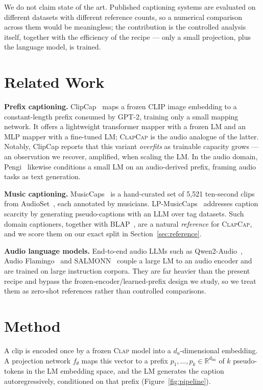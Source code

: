 \documentclass[conference]{IEEEtran}
\newcommand{\clapenc}{\textsc{Clap}}
\newcommand{\sys}{\textsc{ClapCap}}
\begin{document}
We do not claim state of the art. Published captioning systems are evaluated on different
datasets with different reference counts, so a numerical comparison across them would be
meaningless; the contribution is the controlled analysis itself, together with the efficiency of
the recipe --- only a small projection, plus the language model, is trained.

\section{Related Work}\label{ch:related}

\textbf{Prefix captioning.} ClipCap~\cite{mokady2021clipcap} maps a frozen CLIP image embedding
to a constant-length prefix consumed by GPT-2, training only a small mapping network. It offers
a lightweight transformer mapper with a frozen LM and an MLP mapper with a fine-tuned LM;
\sys{} is the audio analogue of the latter. Notably, ClipCap reports that this variant
\emph{overfits} as trainable capacity grows --- an observation we recover, amplified, when
scaling the LM. In the audio domain, Pengi~\cite{deshmukh2023pengi} likewise conditions a small
LM on an audio-derived prefix, framing audio tasks as text generation.

\textbf{Music captioning.} MusicCaps~\cite{agostinelli2023musiclm} is a hand-curated set of
5{,}521 ten-second clips from AudioSet~\cite{gemmeke2017audioset}, each annotated by musicians.
LP-MusicCaps~\cite{doh2023lpmusiccaps} addresses caption scarcity by generating pseudo-captions
with an LLM over tag datasets. Such domain captioners, together with
BLAP~\cite{lanzendorfer2025blap}, are a natural \emph{reference} for \sys{}, and we score them
on our exact split in Section~\ref{sec:reference}.

\textbf{Audio language models.} End-to-end audio LLMs such as
Qwen2-Audio~\cite{chu2024qwen2audio}, Audio Flamingo~\cite{ghosh2026afnext} and
SALMONN~\cite{tang2024salmonn} couple a large LM to an audio encoder and are trained on large
instruction corpora. They are far heavier than the present recipe and bypass the
frozen-encoder/learned-prefix design we study, so we treat them as zero-shot references rather
than controlled comparisons.

\section{Method}\label{ch:method}

A clip is encoded once by a frozen \clapenc{} model into a $d_a$-dimensional embedding. A
projection network $f_\theta$ maps this vector to a prefix
$p_1,\dots,p_k \in \mathbb{R}^{d_{\text{lm}}}$ of $k$ pseudo-tokens in the LM embedding space,
and the LM generates the caption autoregressively, conditioned on that prefix
(Figure~\ref{fig:pipeline}).
\end{document}
